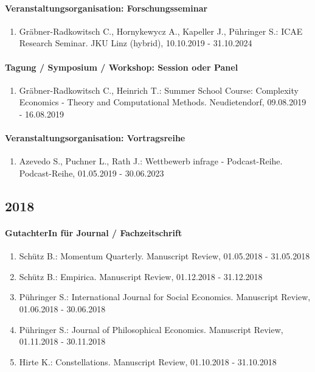 \paragraph{Veranstaltungsorganisation: Forschungsseminar}
\begin{enumerate}[leftmargin=*, labelsep=0.5cm]
\item Gräbner-Radkowitsch C., Hornykewycz A., Kapeller J., Pühringer S.: ICAE Research Seminar. JKU Linz (hybrid), 10.10.2019 - 31.10.2024
\end{enumerate}
\paragraph{Tagung / Symposium / Workshop: Session oder Panel}
\begin{enumerate}[leftmargin=*, labelsep=0.5cm]
\item Gräbner-Radkowitsch C., Heinrich T.: Summer School Course: Complexity Economics - Theory and Computational Methods. Neudietendorf, 09.08.2019 - 16.08.2019
\end{enumerate}
\paragraph{Veranstaltungsorganisation: Vortragsreihe}
\begin{enumerate}[leftmargin=*, labelsep=0.5cm]
\item Azevedo S., Puchner L., Rath J.: Wettbewerb infrage - Podcast-Reihe. Podcast-Reihe, 01.05.2019 - 30.06.2023
\end{enumerate}\subsection*{2018}\paragraph{GutachterIn für Journal / Fachzeitschrift}
\begin{enumerate}[leftmargin=*, labelsep=0.5cm]
\item Schütz B.: Momentum Quarterly. Manuscript Review, 01.05.2018 - 31.05.2018
\item Schütz B.: Empirica. Manuscript Review, 01.12.2018 - 31.12.2018
\item Pühringer S.: International Journal for Social Economics. Manuscript Review, 01.06.2018 - 30.06.2018
\item Pühringer S.: Journal of Philosophical Economics. Manuscript Review, 01.11.2018 - 30.11.2018
\item Hirte K.: Constellations. Manuscript Review, 01.10.2018 - 31.10.2018
\end{enumerate}
